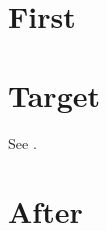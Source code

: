 \documentclass{article}
\begin{document}
\tableofcontents
\section{First}
\section{Target}\label{tgt}
See .
\section{After }
\end{document}
